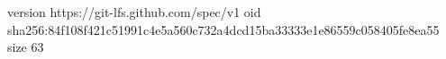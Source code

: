 version https://git-lfs.github.com/spec/v1
oid sha256:84f108f421c51991c4e5a560c732a4dcd15ba33333e1e86559c058405fe8ea55
size 63
